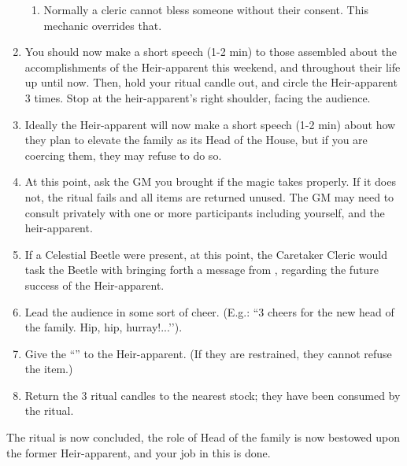 \documentclass[green]{GL2020}
\begin{document}
\begin{enumerate}
    \begin{enumerate}
      \item Normally a cleric cannot bless someone without their consent. This mechanic overrides that.
    \end{enumerate}
  \item You should now make a short speech (1-2 min) to those assembled about the accomplishments of the Heir-apparent this weekend, and throughout their life up until now. Then, hold your ritual candle out, and circle the Heir-apparent 3 times. Stop at the heir-apparent’s right shoulder, facing the audience.
  \item Ideally the Heir-apparent will now make a short speech (1-2 min) about how they plan to elevate the \cFaledonParent{\formal} family as its Head of the House, but if you are coercing them, they may refuse to do so.
  \item At this point, ask the GM you brought if the magic takes properly. If it does not, the ritual fails and all items are returned unused. The GM may need to consult privately with one or more participants including yourself, and the heir-apparent.
  \item If a Celestial Beetle were present, at this point, the Caretaker Cleric would task the Beetle with bringing forth a message from \cTechGod{}, regarding the future success of the Heir-apparent.
  \item Lead the audience in some sort of cheer. (E.g.: ``3 cheers for the new head of the \cFaledonParent{\formal} family. Hip, hip, hurray!...’’).
  \item Give the ``\iFaledonRing{}'' to the Heir-apparent. (If they are restrained, they cannot refuse the item.)
  \item Return the 3 ritual candles to the nearest stock; they have been consumed  by the ritual.
\end{enumerate}

The ritual is now concluded, the role of Head of the \cFaledonParent{\formal} family is now bestowed upon the former Heir-apparent, and your job in this is done.
\end{document}
